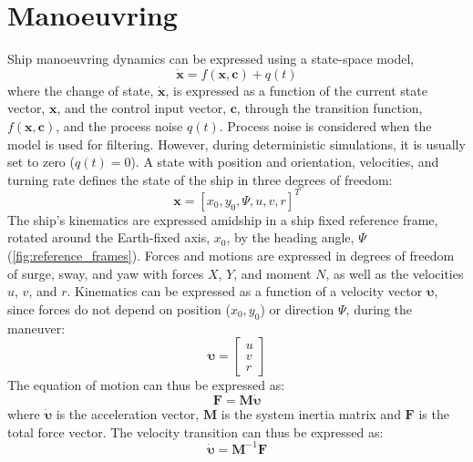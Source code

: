 \section{Manoeuvring} \label{sec:manoeuvring}
Ship manoeuvring dynamics can be expressed using a state-space model,
\begin{equation}
    \dot{\mathbf{x}}=f(\mathbf{x},\mathbf{c}) + q(t)
    \label{eq:state_space}
\end{equation}
where the change of state, $\dot{\mathbf{x}}$, is expressed as a function of the current state vector, $\mathbf{x}$, and the control input vector, $\mathbf{c}$, through the transition function, $f(\mathbf{x},\mathbf{c})$, and the process noise $q(t)$.  Process noise is considered when the model is used for filtering. However, during deterministic simulations, it is usually set to zero ($q(t)=0$).
A state with position and orientation, velocities, and turning rate defines the state of the ship in three degrees of freedom: 
\begin{equation}
    \mathbf{x} = [x_0,y_0,\Psi, u,v,r]^T
    \label{eq:state}
\end{equation}
The ship’s kinematics are expressed amidship in a ship fixed reference frame, rotated around the Earth-fixed axis, $x_0$, by the heading angle, $\Psi$ (\autoref{fig:reference_frames}). Forces and motions are expressed in degrees of freedom of surge, sway, and yaw with forces $X$, $Y$, and moment $N$, as well as the velocities $u$, $v$, and $r$. Kinematics can be expressed as a function of a velocity vector $\pmb{\upsilon}$, since forces do not depend on position ($x_0,y_0$) or direction $\Psi$, during the maneuver:
\begin{equation}
    \label{eq:upsilon}
    \pmb{\upsilon} = \left[\begin{matrix}u\\v\\r\end{matrix}\right]
\end{equation}
The equation of motion can thus be expressed as:
\begin{equation}
    \label{eq:eom}
    \mathbf{F} = \mathbf{M}  \pmb{\dot{\upsilon}} 
\end{equation}
where $\pmb{\dot{\upsilon}}$ is the acceleration vector, $\mathbf{M}$ is the system inertia matrix and $\mathbf{F}$ is the total force vector.
The velocity transition can thus be expressed as:
\begin{equation}
    \label{eq:acc}
    \pmb{\dot{\upsilon}} = \mathbf{M}^{-1}\mathbf{F}
\end{equation}
